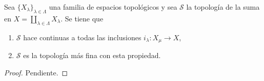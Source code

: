 

\begin{proposition}
Sea $\{ X_{\lambda} \}_{\lambda \in \Lambda}$ una familia de espacios topológicos y sea $\mathcal{S}$ la topología de la suma en $X = \coprod_{\lambda \in \Lambda} X_{\lambda}$. Se tiene que
\begin{enumerate}[label=\textnormal{(\roman*)}]
\item $\mathcal{S}$ hace continuas a todas las inclusiones $i_{\lambda} : X_{\mu} \longrightarrow X$,
\item $\mathcal{S}$ es la topología más fina con esta propiedad.
\end{enumerate} 
\end{proposition}

\begin{proof}
Pendiente.
\end{proof}
